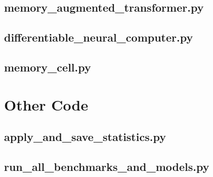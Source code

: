 \documentclass[draft,final]{vutinfth} %
\begin{document}
    \subsection{memory\_augmented\_transformer.py}
    

    \subsection{differentiable\_neural\_computer.py}
    

    \subsection{memory\_cell.py}
    


    \section{Other Code}

    \subsection{apply\_and\_save\_statistics.py}
    

    \subsection{run\_all\_benchmarks\_and\_models.py}
    




    \backmatter

    \listoffigures %

    \cleardoublepage %
    \listoftables %


    \printindex

    \printglossaries

    
    
\end{document}
